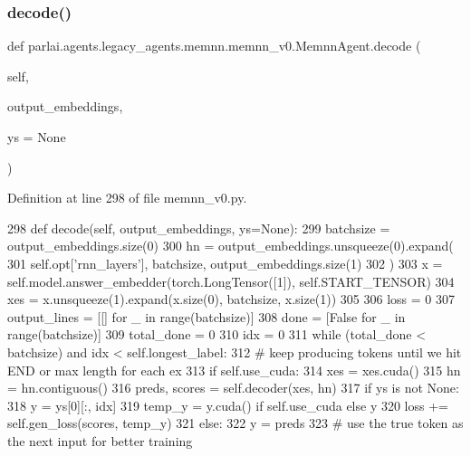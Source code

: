 \subsubsection{\texorpdfstring{decode()}{decode()}}
{\footnotesize\ttfamily def parlai.\+agents.\+legacy\+\_\+agents.\+memnn.\+memnn\+\_\+v0.\+Memnn\+Agent.\+decode (\begin{DoxyParamCaption}\item[{}]{self,  }\item[{}]{output\+\_\+embeddings,  }\item[{}]{ys = {\ttfamily None} }\end{DoxyParamCaption})}



Definition at line 298 of file memnn\+\_\+v0.\+py.


\begin{DoxyCode}
298     \textcolor{keyword}{def }decode(self, output\_embeddings, ys=None):
299         batchsize = output\_embeddings.size(0)
300         hn = output\_embeddings.unsqueeze(0).expand(
301             self.opt[\textcolor{stringliteral}{'rnn\_layers'}], batchsize, output\_embeddings.size(1)
302         )
303         x = self.model.answer\_embedder(torch.LongTensor([1]), self.START\_TENSOR)
304         xes = x.unsqueeze(1).expand(x.size(0), batchsize, x.size(1))
305 
306         loss = 0
307         output\_lines = [[] \textcolor{keywordflow}{for} \_ \textcolor{keywordflow}{in} range(batchsize)]
308         done = [\textcolor{keyword}{False} \textcolor{keywordflow}{for} \_ \textcolor{keywordflow}{in} range(batchsize)]
309         total\_done = 0
310         idx = 0
311         \textcolor{keywordflow}{while} (total\_done < batchsize) \textcolor{keywordflow}{and} idx < self.longest\_label:
312             \textcolor{comment}{# keep producing tokens until we hit END or max length for each ex}
313             \textcolor{keywordflow}{if} self.use\_cuda:
314                 xes = xes.cuda()
315                 hn = hn.contiguous()
316             preds, scores = self.decoder(xes, hn)
317             \textcolor{keywordflow}{if} ys \textcolor{keywordflow}{is} \textcolor{keywordflow}{not} \textcolor{keywordtype}{None}:
318                 y = ys[0][:, idx]
319                 temp\_y = y.cuda() \textcolor{keywordflow}{if} self.use\_cuda \textcolor{keywordflow}{else} y
320                 loss += self.gen\_loss(scores, temp\_y)
321             \textcolor{keywordflow}{else}:
322                 y = preds
323             \textcolor{comment}{# use the true token as the next input for better training}

\end{DoxyCode}
